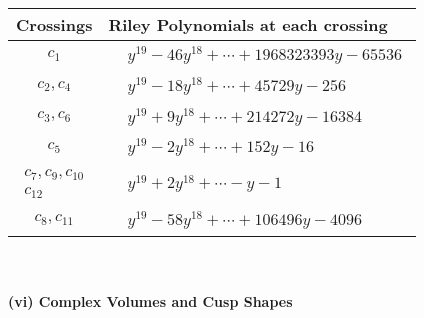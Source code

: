 \documentclass[1p]{elsarticle_modified}
\theoremstyle{definition}
\begin{document}
\begin{tabular}{m{50pt}|m{274pt}}
Crossings & \hspace{64pt}Riley Polynomials at each crossing \\
\hline $$\begin{aligned}c_{1}\end{aligned}$$&$\begin{aligned}
&y^{19}-46 y^{18}+\cdots+1968323393 y-65536
\end{aligned}$\\
\hline $$\begin{aligned}c_{2},c_{4}\end{aligned}$$&$\begin{aligned}
&y^{19}-18 y^{18}+\cdots+45729 y-256
\end{aligned}$\\
\hline $$\begin{aligned}c_{3},c_{6}\end{aligned}$$&$\begin{aligned}
&y^{19}+9 y^{18}+\cdots+214272 y-16384
\end{aligned}$\\
\hline $$\begin{aligned}c_{5}\end{aligned}$$&$\begin{aligned}
&y^{19}-2 y^{18}+\cdots+152 y-16
\end{aligned}$\\
\hline $$\begin{aligned}c_{7},c_{9},c_{10}\\c_{12}\end{aligned}$$&$\begin{aligned}
&y^{19}+2 y^{18}+\cdots- y-1
\end{aligned}$\\
\hline $$\begin{aligned}c_{8},c_{11}\end{aligned}$$&$\begin{aligned}
&y^{19}-58 y^{18}+\cdots+106496 y-4096
\end{aligned}$\\
\hline
\end{tabular}\\~\\
\newpage\flushleft \textbf{(vi) Complex Volumes and Cusp Shapes}
\end{document}
